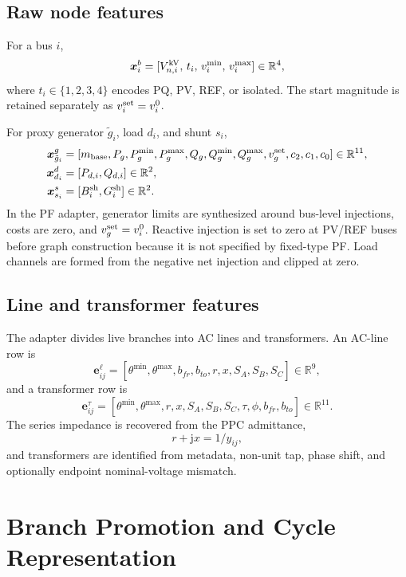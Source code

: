 \documentclass[10pt]{article}
\newcommand{\R}{\mathbb{R}}
\begin{document}
\subsection{Raw node features}

For a bus \(i\),
\begin{equation}
 \bm x_i^b=[V_{n,i}^{\rm kV},\,t_i,\,v_i^{\min},\,v_i^{\max}]\in\R^4,
\end{equation}
where \(t_i\in\{1,2,3,4\}\) encodes PQ, PV, REF, or isolated. The start
magnitude is retained separately as \(v_{i}^{\rm set}=v_i^0\).

For proxy generator \(\tilde g_i\), load \(d_i\), and shunt \(s_i\),
\begin{align}
 \bm x_{\tilde g_i}^g&=[m_{\rm base},P_g,P_g^{\min},P_g^{\max},Q_g,
 Q_g^{\min},Q_g^{\max},v_g^{\rm set},c_2,c_1,c_0]\in\R^{11},\\
 \bm x_{d_i}^d&=[P_{d,i},Q_{d,i}]\in\R^2,\\
 \bm x_{s_i}^s&=[B_i^{\rm sh},G_i^{\rm sh}]\in\R^2.
\end{align}
In the PF adapter, generator limits are synthesized around bus-level injections,
costs are zero, and \(v_g^{\rm set}=v_i^0\). Reactive injection is set to zero at
PV/REF buses before graph construction because it is not specified by fixed-type
PF. Load channels are formed from the negative net injection and clipped at zero.

\subsection{Line and transformer features}

The adapter divides live branches into AC lines and transformers. An AC-line row is
\begin{equation}
 \bm e_{ij}^{\ell}=[\theta^{\min},\theta^{\max},b_{fr},b_{to},r,x,
 S_A,S_B,S_C]\in\R^9,
\end{equation}
and a transformer row is
\begin{equation}
 \bm e_{ij}^{\tau}=[\theta^{\min},\theta^{\max},r,x,S_A,S_B,S_C,
 \tau,\phi,b_{fr},b_{to}]\in\R^{11}.
\end{equation}
The series impedance is recovered from the PPC admittance,
\begin{equation}
 r+\mathrm jx=1/y_{ij},
\end{equation}
and transformers are identified from metadata, non-unit tap, phase shift, and
optionally endpoint nominal-voltage mismatch.

\section{Branch Promotion and Cycle Representation}
\end{document}

